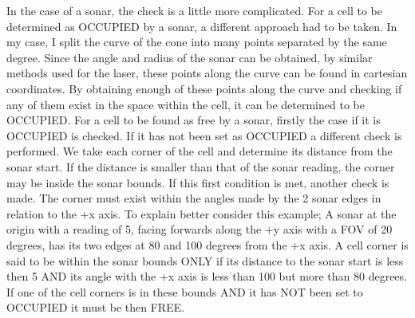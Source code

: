 In the case of a sonar, the check is a little more complicated. For a cell to be determined as O\+C\+C\+U\+P\+I\+ED by a sonar, a different approach had to be taken. In my case, I split the curve of the cone into many points separated by the same degree. Since the angle and radius of the sonar can be obtained, by similar methods used for the laser, these points along the curve can be found in cartesian coordinates. By obtaining enough of these points along the curve and checking if any of them exist in the space within the cell, it can be determined to be O\+C\+C\+U\+P\+I\+ED. For a cell to be found as free by a sonar, firstly the case if it is O\+C\+C\+U\+P\+I\+ED is checked. If it has not been set as O\+C\+C\+U\+P\+I\+ED a different check is performed. We take each corner of the cell and determine its distance from the sonar start. If the distance is smaller than that of the sonar reading, the corner may be inside the sonar bounds. If this first condition is met, another check is made. The corner must exist within the angles made by the 2 sonar edges in relation to the +x axis. To explain better consider this example; A sonar at the origin with a reading of 5, facing forwards along the +y axis with a F\+OV of 20 degrees, has its two edges at 80 and 100 degrees from the +x axis. A cell corner is said to be within the sonar bounds O\+N\+LY if its distance to the sonar start is less then 5 A\+ND its angle with the +x axis is less than 100 but more than 80 degrees. If one of the cell corners is in these bounds A\+ND it has N\+OT been set to O\+C\+C\+U\+P\+I\+ED it must be then F\+R\+EE.

